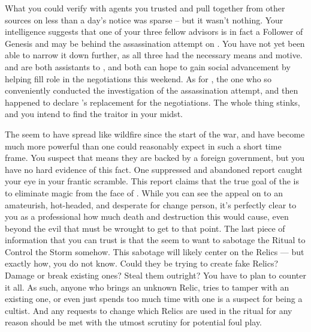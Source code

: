 \documentclass[char]{GL2020}
\begin{document}
What you could verify with agents you trusted and pull together from other sources on less than a day's notice was sparse -- but it wasn't nothing. Your intelligence suggests that one of your three fellow \pShip{} advisors is in fact a Follower of Genesis and may be behind the assassination attempt on \cHeadDiplomat{}. You have not yet been able to narrow it down further, as all three had the necessary means and motive. \cChupLeader{\full} and \cJuniorStatesman{\full} are both assistants to \cHeadDiplomat{}, and both can hope to gain social advancement by helping fill \cHeadDiplomat{\their} role in the negotiations this weekend. As for \cEbbPriest{\full}, \cEbbPriest{\they} \cEbbPriest{\were} the one who so conveniently conducted the investigation of the assassination attempt, and then happened to declare \cEbbPriest{\themself} \cHeadDiplomat{}'s replacement for the negotiations. The whole thing stinks, and you intend to find the traitor in your midst. 

The \pGoaties{} seem to have spread like wildfire since the start of the war, and have become much more powerful than one could reasonably expect in such a short time frame. You suspect that means they are backed by a foreign government, but you have no hard evidence of this fact. One suppressed and abandoned report caught your eye in your frantic scramble. This report claims that the true goal of the \pGoaties{} is to eliminate magic from the face of \pEarth{}. While you can see the appeal on to an amateurish, hot-headed, and desperate for change person, it's perfectly clear to you as a professional how much death and destruction this would cause, even beyond the evil that must be wrought to get to that point. The last piece of information that you can trust is that the \pGoaties{} seem to want to sabotage the Ritual to Control the Storm somehow. This sabotage will likely center on the Relics — but exactly how, you do not know. Could they be trying to create fake Relics? Damage or break existing ones? Steal them outright? You have to plan to counter it all. As such, anyone who brings an unknown Relic, tries to tamper with an existing one, or even just spends too much time with one is a suspect for being a cultist. And any requests to change which Relics are used in the ritual for any reason should be met with the utmost scrutiny for potential foul play. 
\end{document}

